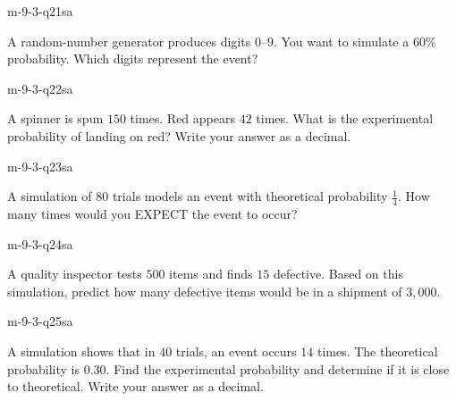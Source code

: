 \begin{practiceQuestion}{m-9-3-q21}{sa}
\begin{questionText}
A random-number generator produces digits $0$--$9$. You want to simulate a $60\%$ probability. Which digits represent the event?
\end{questionText}
\end{practiceQuestion}

\begin{practiceQuestion}{m-9-3-q22}{sa}
\begin{questionText}
A spinner is spun $150$ times. Red appears $42$ times. What is the experimental probability of landing on red? Write your answer as a decimal.
\end{questionText}
\end{practiceQuestion}

\begin{practiceQuestion}{m-9-3-q23}{sa}
\begin{questionText}
A simulation of $80$ trials models an event with theoretical probability $\frac{1}{4}$. How many times would you EXPECT the event to occur?
\end{questionText}
\end{practiceQuestion}

\begin{practiceQuestion}{m-9-3-q24}{sa}
\begin{questionText}
A quality inspector tests $500$ items and finds $15$ defective. Based on this simulation, predict how many defective items would be in a shipment of $3{,}000$.
\end{questionText}
\end{practiceQuestion}

\begin{practiceQuestion}{m-9-3-q25}{sa}
\begin{questionText}
A simulation shows that in $40$ trials, an event occurs $14$ times. The theoretical probability is $0.30$. Find the experimental probability and determine if it is close to theoretical. Write your answer as a decimal.
\end{questionText}
\end{practiceQuestion}

